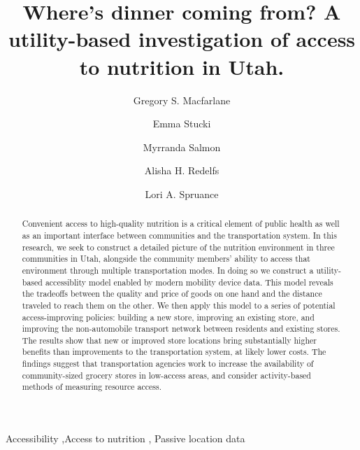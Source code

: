 \documentclass[
  letterpaper,
  number,
  review,
  3p]{elsarticle}
\begin{document}
\begin{frontmatter}
\title{Where's dinner coming from? A utility-based investigation of
access to nutrition in Utah.}
\author[1]{Gregory S. Macfarlane%
%
}
\author[1]{Emma Stucki%
%
}

\author[1]{Myrranda Salmon%
%
}

\author[2]{Alisha H. Redelfs%
%
}

\author[2]{Lori A. Spruance%
%
}








        
\begin{abstract}
Convenient access to high-quality nutrition is a critical element of
public health as well as an important interface between communities and
the transportation system. In this research, we seek to construct a
detailed picture of the nutrition environment in three communities in
Utah, alongside the community members' ability to access that
environment through multiple transportation modes. In doing so we
construct a utility-based accessiblity model enabled by modern mobility
device data. This model reveals the tradeoffs between the quality and
price of goods on one hand and the distance traveled to reach them on
the other. We then apply this model to a series of potential
access-improving policies: building a new store, improving an existing
store, and improving the non-automobile transport network between
residents and existing stores. The results show that new or improved
store locations bring substantially higher benefits than improvements to
the transportation system, at likely lower costs. The findings suggest
that transportation agencies work to increase the availability of
community-sized grocery stores in low-access areas, and consider
activity-based methods of measuring resource access.
\end{abstract}





\begin{keyword}
    Accessibility \sep Access to nutrition \sep 
    Passive location data
\end{keyword}
\end{frontmatter}
    
\end{document}
